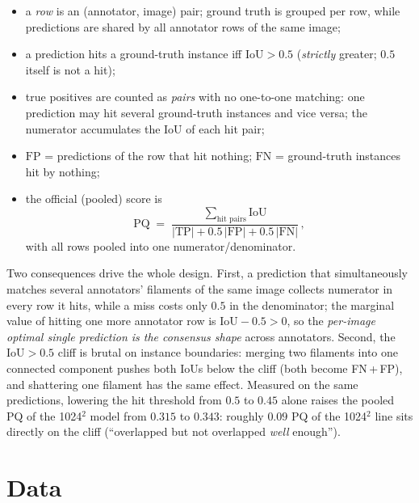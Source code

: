 \documentclass[11pt]{article}
\newcommand{\pq}{\mathrm{PQ}}
\newcommand{\IoU}{\mathrm{IoU}}
\begin{document}
\begin{itemize}
\item a \emph{row} is an (annotator, image) pair; ground truth is grouped
      per row, while predictions are shared by all annotator rows of the
      same image;
\item a prediction hits a ground-truth instance iff $\IoU > 0.5$
      (\emph{strictly} greater; $0.5$ itself is not a hit);
\item true positives are counted as \emph{pairs} with no one-to-one
      matching: one prediction may hit several ground-truth instances and
      vice versa; the numerator accumulates the $\IoU$ of each hit pair;
\item $\mathrm{FP}$ = predictions of the row that hit nothing;
      $\mathrm{FN}$ = ground-truth instances hit by nothing;
\item the official (pooled) score is
      \[
        \pq \;=\; \frac{\sum_{\text{hit pairs}} \IoU}
             {|\mathrm{TP}| + 0.5\,|\mathrm{FP}| + 0.5\,|\mathrm{FN}|}\,,
      \]
      with all rows pooled into one numerator/denominator.
\end{itemize}

Two consequences drive the whole design. First, a prediction that
simultaneously matches several annotators' filaments of the same image
collects numerator in every row it hits, while a miss costs only
$0.5$ in the denominator; the marginal value of hitting one more annotator
row is $\IoU - 0.5 > 0$, so the \emph{per-image optimal single prediction
is the consensus shape} across annotators. Second, the $\IoU>0.5$ cliff is
brutal on instance boundaries: merging two filaments into one connected
component pushes both IoUs below the cliff (both become FN\,+\,FP), and
shattering one filament has the same effect. Measured on the same
predictions, lowering the hit threshold from $0.5$ to $0.45$ alone raises
the pooled PQ of the 1024$^2$ model from $0.315$ to $0.343$: roughly
$0.09$ PQ of the 1024$^2$ line sits directly on the cliff
(``overlapped but not overlapped \emph{well} enough'').

\section{Data}
\label{sec:data}
\end{document}
